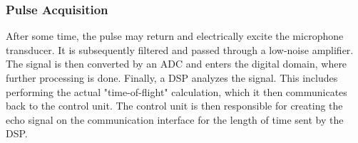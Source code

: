 \subsubsection{Pulse Acquisition}
After some time, the pulse may return and electrically excite the microphone transducer. It is subsequently filtered and passed through a low-noise amplifier.
The signal is then converted by an ADC and enters the digital domain, where further processing is done. Finally, a DSP analyzes the signal. This includes performing the actual
"time-of-flight" calculation, which it then communicates back to the control unit. The control unit is then responsible for creating the echo signal on the communication interface
for the length of time sent by the DSP.